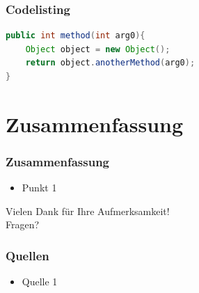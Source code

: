 \documentclass[xcolor=dvipsnames]{beamer}
\begin{document}
\begin{frame}[fragile]\frametitle{Codelisting}
\begin{lstlisting}[language=Java]
public int method(int arg0){
    Object object = new Object();
    return object.anotherMethod(arg0);
}
\end{lstlisting}
\end{frame}

\section{Zusammenfassung}
\frame{\tableofcontents[current]}

\begin{frame}\frametitle{Zusammenfassung}
	\begin{itemize}
		\item Punkt 1
	\end{itemize}
\end{frame}


\begin{frame}
	\centering
	\textcolor{htwgreen}{{\LARGE Vielen Dank für Ihre Aufmerksamkeit!\\[6ex] Fragen?}}
\end{frame}

\begin{frame}\frametitle{Quellen}
		\begin{itemize}
		\item Quelle 1
	\end{itemize}
\end{frame}
\end{document}
